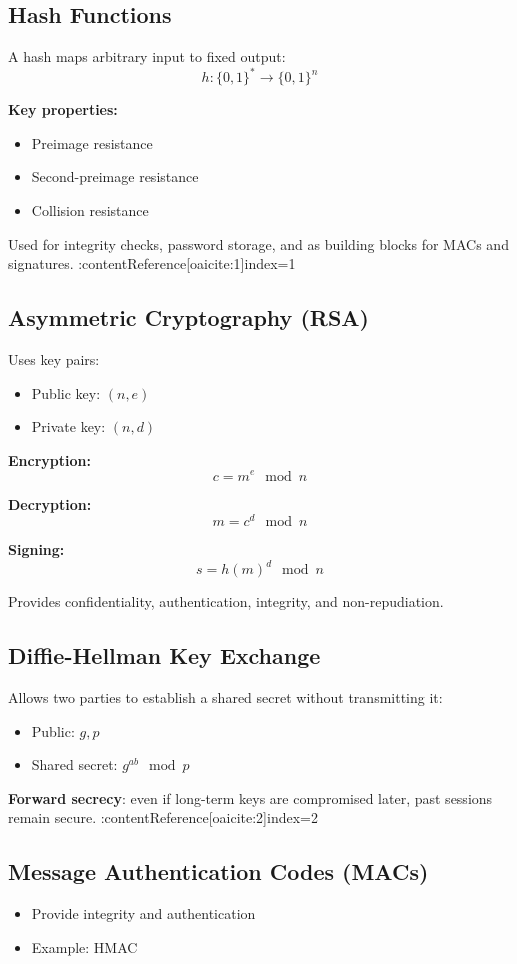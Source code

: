\subsection{Hash Functions}
A hash maps arbitrary input to fixed output:
\[
h : \{0,1\}^* \rightarrow \{0,1\}^n
\]

\textbf{Key properties:}
\begin{itemize}
    \item Preimage resistance
    \item Second-preimage resistance
    \item Collision resistance
\end{itemize}

Used for integrity checks, password storage, and as building blocks for MACs and signatures. :contentReference[oaicite:1]{index=1}

\subsection{Asymmetric Cryptography (RSA)}
Uses key pairs:
\begin{itemize}
    \item Public key: $(n, e)$
    \item Private key: $(n, d)$
\end{itemize}

\textbf{Encryption:}
\[
c = m^e \mod n
\]

\textbf{Decryption:}
\[
m = c^d \mod n
\]

\textbf{Signing:}
\[
s = h(m)^d \mod n
\]

Provides confidentiality, authentication, integrity, and non-repudiation.

\subsection{Diffie-Hellman Key Exchange}
Allows two parties to establish a shared secret without transmitting it:
\begin{itemize}
    \item Public: $g, p$
    \item Shared secret: $g^{ab} \mod p$
\end{itemize}

\textbf{Forward secrecy}: even if long-term keys are compromised later, past sessions remain secure. :contentReference[oaicite:2]{index=2}

\subsection{Message Authentication Codes (MACs)}
\begin{itemize}
    \item Provide integrity and authentication
    \item Example: HMAC
\end{itemize}

